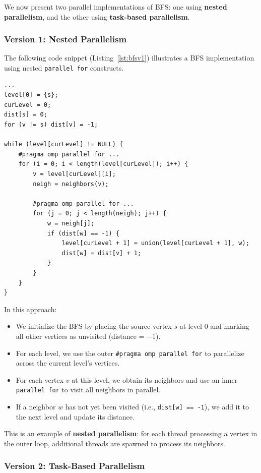\documentclass[12pt]{book}
\begin{document}
We now present two parallel implementations of BFS: one using \textbf{nested parallelism}, and the other using \textbf{task-based parallelism}.

\subsubsection{Version 1: Nested Parallelism}

The following code snippet (Listing~\ref{lst:bfsv1}) illustrates a BFS implementation using nested \texttt{parallel for} constructs.

\begin{lstlisting}[style=cppstyle, caption={Parallel BFS using nested parallelism}, captionpos=b, label={lst:bfsv1}]
...
level[0] = {s};
curLevel = 0;
dist[s] = 0;
for (v != s) dist[v] = -1;

while (level[curLevel] != NULL) {
    #pragma omp parallel for ...
    for (i = 0; i < length(level[curLevel]); i++) {
        v = level[curLevel][i];
        neigh = neighbors(v);

        #pragma omp parallel for ...
        for (j = 0; j < length(neigh); j++) {
            w = neigh[j];
            if (dist[w] == -1) {
                level[curLevel + 1] = union(level[curLevel + 1], w);
                dist[w] = dist[v] + 1;
            }
        }
    }
}
\end{lstlisting}

In this approach:
\begin{itemize}
    \item We initialize the BFS by placing the source vertex $s$ at level $0$ and marking all other vertices as unvisited (distance = $-1$).
    \item For each level, we use the outer \texttt{\#pragma omp parallel for} to parallelize across the current level's vertices.
    \item For each vertex $v$ at this level, we obtain its neighbors and use an inner \texttt{parallel for} to visit all neighbors in parallel.
    \item If a neighbor $w$ has not yet been visited (i.e., \texttt{dist[w] == -1}), we add it to the next level and update its distance.
\end{itemize}

This is an example of \textbf{nested parallelism}: for each thread processing a vertex in the outer loop, additional threads are spawned to process its neighbors.

\subsubsection{Version 2: Task-Based Parallelism}
\end{document}
